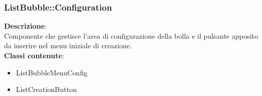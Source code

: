 \subsubsection{ListBubble::Configuration}
   \FloatBarrier
\FloatBarrier
\textbf{Descrizione}:\\
 Componente che gestisce l'area di configurazione della bolla e il pulsante apposito da inserire nel menu iniziale di creazione. 
\\ \textbf{Classi contenute}:\\
\begin{itemize}
\item ListBubbleMenuConfig
\item ListCreationButton
\end{itemize}


\clearpage

